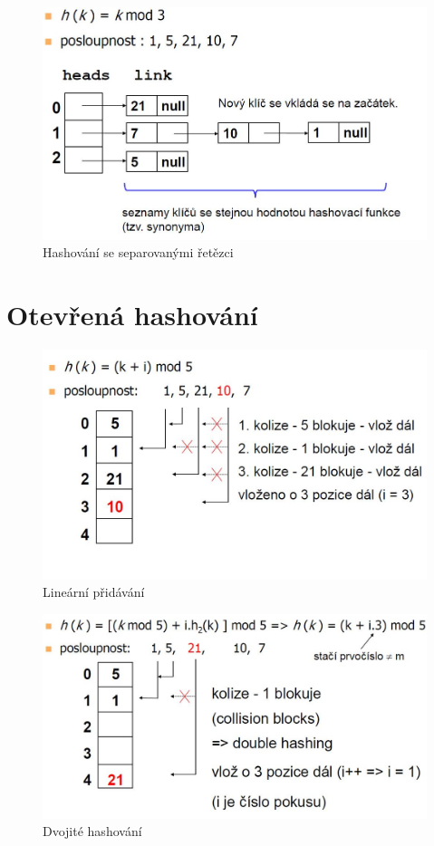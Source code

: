 \documentclass{book}
\begin{document}
\begin{figure}[h!]
\begin{center}
\includegraphics[width=12cm]{string.jpg}
\caption{Hashování se separovanými řetězci}
\label{fig:strings}
\end{center}
\end{figure}

\section{Otevřená hashování}

\begin{figure}[h]
\begin{center}
\includegraphics[width=12cm]{linear_probing.jpg}
\caption{Lineární přidávání}
\label{fig:linear_probing}
\end{center}
\end{figure}

\begin{figure}[h]
\begin{center}
\includegraphics[width=12cm]{double_hashing.jpg}
\caption{Dvojité hashování}
\label{fig:double_hashing}
\end{center}
\end{figure}
\end{document}
